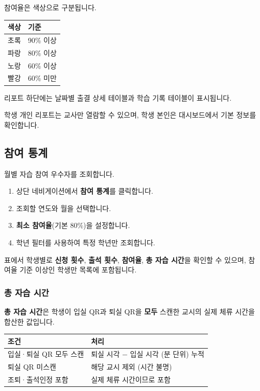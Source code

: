 \documentclass[a4paper,12pt]{article}
\newcommand{\menu}[1]{\textcolor{primary}{\textbf{#1}}}
\begin{document}
참여율은 색상으로 구분됩니다.

\begin{center}
\begin{tabular}{ll}
\toprule
\textbf{색상} & \textbf{기준} \\
\midrule
초록 & 90\% 이상 \\
파랑 & 80\% 이상 \\
노랑 & 60\% 이상 \\
빨강 & 60\% 미만 \\
\bottomrule
\end{tabular}
\end{center}

리포트 하단에는 날짜별 출결 상세 테이블과 학습 기록 테이블이 표시됩니다.

\begin{notebox}
  학생 개인 리포트는 교사만 열람할 수 있으며, 학생 본인은 대시보드에서 기본 정보를 확인합니다.
\end{notebox}

\subsection{참여 통계}

월별 자습 참여 우수자를 조회합니다.

\begin{enumerate}[leftmargin=1.5em]
    \item 상단 네비게이션에서 \menu{참여 통계}를 클릭합니다.
    \item 조회할 연도와 월을 선택합니다.
    \item \textbf{최소 참여율}(기본 80\%)을 설정합니다.
    \item 학년 필터를 사용하여 특정 학년만 조회합니다.
\end{enumerate}

표에서 학생별로 \textbf{신청 횟수}, \textbf{출석 횟수}, \textbf{참여율},
\textbf{총 자습 시간}을 확인할 수 있으며,
참여율 기준 이상인 학생만 목록에 포함됩니다.

\subsubsection{총 자습 시간}

\textbf{총 자습 시간}은 학생이 입실 QR과 퇴실 QR을 \textbf{모두} 스캔한 교시의
실제 체류 시간을 합산한 값입니다.

\begin{center}
\begin{tabular}{ll}
\toprule
\textbf{조건} & \textbf{처리} \\
\midrule
입실·퇴실 QR 모두 스캔 & 퇴실 시각 $-$ 입실 시각 (분 단위) 누적 \\
퇴실 QR 미스캔 & 해당 교시 제외 (시간 불명) \\
조퇴·출석인정 포함 & 실제 체류 시간이므로 포함 \\
\bottomrule
\end{tabular}
\end{center}
\end{document}
